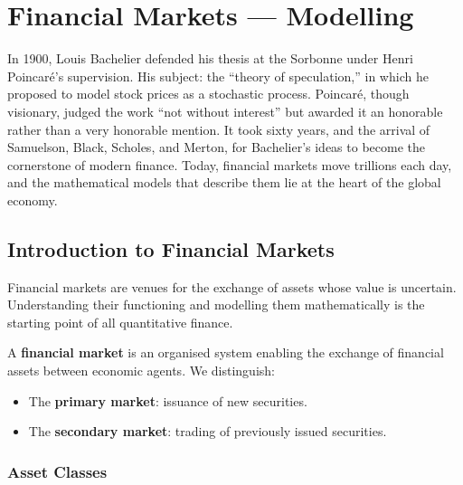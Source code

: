 \chapter{Financial Markets --- Modelling}
\label{ch:markets}

In 1900, Louis Bachelier defended his thesis at the Sorbonne under Henri
Poincar\'e's supervision. His subject: the ``theory of speculation,'' in
which he proposed to model stock prices as a stochastic process. Poincar\'e,
though visionary, judged the work ``not without interest'' but awarded it an
honorable rather than a very honorable mention. It took sixty years, and
the arrival of Samuelson, Black, Scholes, and Merton, for Bachelier's ideas
to become the cornerstone of modern finance. Today, financial markets move
trillions each day, and the mathematical models that describe them lie at
the heart of the global economy.

\section{Introduction to Financial Markets}

Financial markets are venues for the exchange of assets whose value is
uncertain. Understanding their functioning and modelling them mathematically
is the starting point of all quantitative finance.

\begin{definition}
A \textbf{financial market} is an organised system enabling the exchange
of financial assets between economic agents. We distinguish:
\begin{itemize}
    \item The \textbf{primary market}: issuance of new securities.
    \item The \textbf{secondary market}: trading of previously issued securities.
\end{itemize}
\end{definition}

\subsection{Asset Classes}

